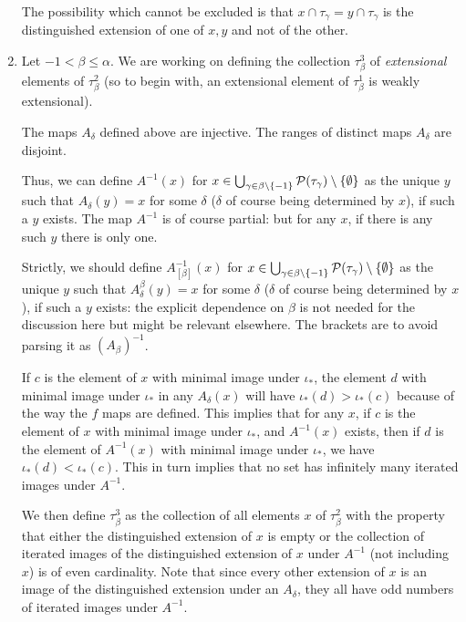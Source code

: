 \documentclass[12pt]{article}
\begin{document}
\begin{enumerate}
The possibility which cannot be excluded is that $x \cap \tau_\gamma = y \cap \tau_\gamma$ is the distinguished extension of one of $x,y$ and not of the other.

\item  Let $-1 < \beta \leq \alpha$.  We are working on defining the collection $\tau_\beta^3$ of {\em extensional\/} elements of $\tau^2_\beta$ (so to begin with,
an extensional element of $\tau^1_\beta$ is weakly extensional).

The maps $A_\delta$ defined above are injective.  The ranges of distinct maps $A_\delta$ are disjoint.  

Thus, we can define $A^{-1}(x)$ for $x \in \bigcup_{\gamma \in \beta\setminus \{-1\}} {\cal P} (\tau_\gamma) \setminus \{\emptyset\}$ as the unique $y$ such that $A_{\delta}(y)=x$ for some $\delta$ ($\delta$ of course being determined by $x$), if such a $y$ exists.  The map $A^{-1}$ is of course partial:  but for any $x$, if there is any such $y$ there is only one.

Strictly, we should define $A_{[\beta]}^{-1}(x)$ for $x \in \bigcup_{\gamma \in \beta\setminus \{-1\}} {\cal P} (\tau_\gamma) \setminus \{\emptyset\}$ as the unique $y$ such that $A^\beta_{\delta}(y)=x$ for some $\delta$ ($\delta$ of course being determined by $x$), if such a $y$ exists:  the explicit dependence on $\beta$ is not needed for the discussion here but might be relevant elsewhere.   The brackets are to avoid parsing it as $(A_\beta)^{-1}$.

If $c$ is the element of $x$ with minimal image under $\iota_*$, the element $d$ with minimal image under $\iota_*$ in any $A_\delta(x)$ will have $\iota_*(d) > \iota_*(c)$ because
of the way the $f$ maps are defined.  This implies that for any $x$, if $c$ is the element of $x$ with minimal image under $\iota_*$, and $A^{-1}(x)$ exists, then if
$d$ is the element of $A^{-1}(x)$ with minimal image under $\iota_*$, we have $\iota_*(d) < \iota_*(c)$.  This in turn implies that no set has infinitely many iterated images
under $A^{-1}$.

We then define $\tau^3_\beta$ as the collection of all elements $x$ of $\tau^2_\beta$ with the property that either the distinguished extension of $x$ is empty or the collection of iterated images of the distinguished extension of
$x$ under $A^{-1}$ (not including $x$) is of even cardinality.  Note that since every other extension of $x$ is an image of the distinguished extension under an $A_\delta$, they all have odd numbers of iterated images under $A^{-1}$.  


\end{enumerate}
\end{document}
